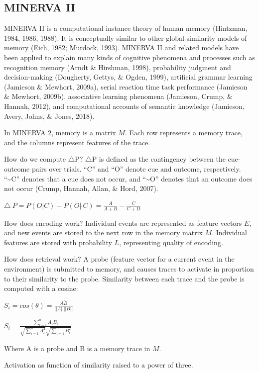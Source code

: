 \documentclass[
  english,
  man,floatsintext]{apa6}
\begin{document}
\hypertarget{minerva-ii}{%
\subsection{MINERVA II}\label{minerva-ii}}

MINERVA II is a computational instance theory of human memory (Hintzman, 1984, 1986, 1988). It is conceptually similar to other global-similarity models of memory (Eich, 1982; Murdock, 1993). MINERVA II and related models have been applied to explain many kinds of cognitive phenomena and processes such as recognition memory (Arndt \& Hirshman, 1998), probability judgment and decision-making (Dougherty, Gettys, \& Ogden, 1999), artificial grammar learning (Jamieson \& Mewhort, 2009a), serial reaction time task performance (Jamieson \& Mewhort, 2009b), associative learning phenomena (Jamieson, Crump, \& Hannah, 2012), and computational accounts of semantic knowledge (Jamieson, Avery, Johns, \& Jones, 2018).

In MINERVA 2, memory is a matrix \(M\). Each row represents a memory trace, and the columns represent features of the trace.

How do we compute \(\triangle\)P? \(\triangle\)P is defined as the contingency between the cue-outcome pairs over trials. ``C'' and ``O'' denote cue and outcome, respectively. ``\textasciitilde C'' denotes that a cue does not occur, and ``\textasciitilde O'' denotes that an outcome does not occur (Crump, Hannah, Allan, \& Hord, 2007).

\(\triangle\ P = P(O|C) - P(O| \tilde\ C) = \frac{A}{A+B} - \frac{C}{C+D}\)

How does encoding work? Individual events are represented as feature vectors \(E\), and new events are stored to the next row in the memory matrix \(M\). Individual features are stored with probability \(L\), representing quality of encoding.

How does retrieval work? A probe (feature vector for a current event in the environment) is submitted to memory, and causes traces to activate in proportion to their similarity to the probe. Similarity between each trace and the probe is computed with a cosine:

\(S_i = cos(\theta) = \frac{A \dot B}{||A|| ||B||}\)

\(S_i = \frac{\sum_{i=1}^n A_iB_i}{\sqrt{\sum_{i=1}^n A_i^2}\sqrt{\sum_{i=1}^n B_i^2}}\)

Where A is a probe and B is a memory trace in \(M\).

Activation as function of similarity raised to a power of three.
\end{document}

